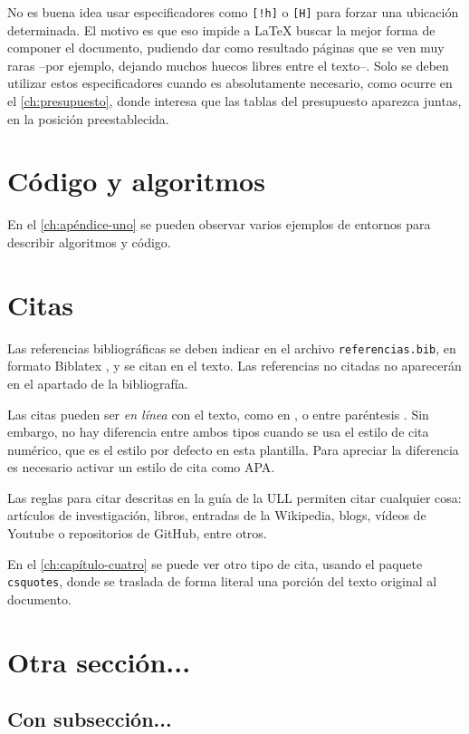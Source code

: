 No es buena idea usar especificadores como \verb|[!h]| o \verb|[H]| para forzar una ubicación determinada. El motivo es que eso impide a \LaTeX{} buscar la mejor forma de componer el documento, pudiendo dar como resultado páginas que se ven muy raras --por ejemplo, dejando muchos huecos libres entre el texto--.
Solo se deben utilizar estos especificadores cuando es absolutamente necesario, como ocurre en el \autoref{ch:presupuesto}, donde interesa que las tablas del presupuesto aparezca juntas, en la posición preestablecida.

\section{Código y algoritmos}

En el \autoref{ch:apéndice-uno} se pueden observar varios ejemplos de entornos para describir algoritmos y código.

\section{Citas}

Las referencias bibliográficas se deben indicar en el archivo \texttt{referencias.bib}, en formato Biblatex \cite{overleaf_biblatex}, y se citan en el texto. Las referencias no citadas no aparecerán en el apartado de la bibliografía.

Las citas pueden ser \emph{en línea} con el texto, como en \cite{examplegithub}, o entre paréntesis \parencite{examplearticle}. Sin embargo, no hay diferencia entre ambos tipos cuando se usa el estilo de cita numérico, que es el estilo por defecto en esta plantilla. Para apreciar la diferencia es necesario activar un estilo de cita como APA.

Las reglas para citar descritas en la guía de la ULL \cite{ulllibguide} permiten citar cualquier cosa: artículos de investigación, libros, entradas de la Wikipedia, blogs, vídeos de Youtube o repositorios de GitHub, entre otros. 

En el \autoref{ch:capítulo-cuatro} se puede ver otro tipo de cita, usando el paquete \texttt{csquotes}, donde se traslada de forma literal una porción del texto original al documento.
 
\section{Otra sección...}

\lipsum[1]

\subsection{Con subsección...}

\lipsum[2]